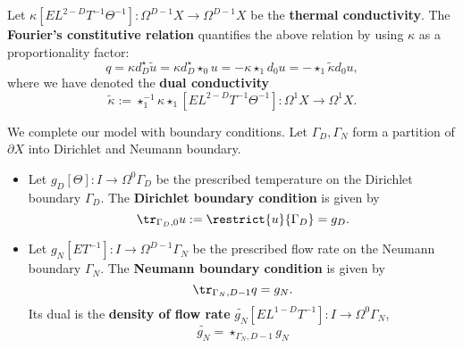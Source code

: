 \begin{discussion}
\begin{itemize}
      Let
      $\kappa [E L^{2 - D} T^{-1} \Theta^{-1}]
      \colon \Omega^{D - 1} X \to \Omega^{D - 1} X$
      be the \textbf{thermal conductivity}.
      The \textbf{Fourier's constitutive relation}
      quantifies the above relation by using $\kappa$
      as a proportionality factor:
      \begin{equation}
        q
        = \kappa d_D^\star \tilde{u}
        = \kappa d_D^\star \star_0 u
        = - \kappa \star_1 d_0 u
        = - \star_1 \tilde{\kappa} d_0 u,
      \end{equation}
      where we have denoted the \textbf{dual conductivity}
      \begin{equation}
        \tilde{\kappa}
        :=\star_1^{-1} \kappa \star_1 [E L^{2 - D} T^{-1} \Theta^{-1}]
        \colon \Omega^1 X \to \Omega^1 X.
      \end{equation}
  \end{itemize}
  We complete our model with boundary conditions.
  Let $\Gamma_D, \Gamma_N$ form a partition of $\partial X$
  into Dirichlet and Neumann boundary.
  \begin{itemize}
    \item
      Let $g_D [\Theta] \colon I \to \Omega^0 \Gamma_D$
      be the prescribed temperature on the Dirichlet boundary $\Gamma_D$.
      The \textbf{Dirichlet boundary condition} is given by
      \begin{equation}
        \tr_{\Gamma_D, 0} u := \restrict{u}{\Gamma_D} = g_D.
      \end{equation}
    \item
      Let $g_N [E T^{-1}] \colon I \to \Omega^{D - 1} \Gamma_N$
      be the prescribed flow rate on the Neumann boundary $\Gamma_N$.
      The \textbf{Neumann boundary condition} is given by
      \begin{equation}
        \tr_{\Gamma_N, D - 1} q = g_N.
      \end{equation}
      Its dual is the \textbf{density of flow rate}
      $\widetilde{g_N} [E L^{1 - D} T^{-1}] \colon I \to \Omega^0 \Gamma_N$,
      \begin{equation}
        \widetilde{g_N} = \star_{\Gamma_N, D - 1} g_N
      \end{equation}
  \end{itemize}
\end{discussion}
